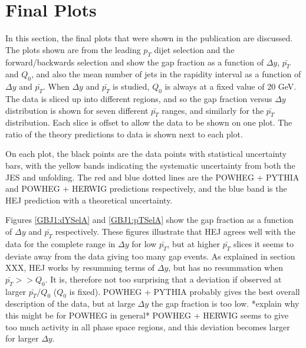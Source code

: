 \section{Final Plots}
\label{sec:GBJ1:FinalPlots}
In this section, the final plots that were shown in the publication are discussed. The plots shown are from  the leading $p_T$ dijet selection and the forward/backwards selection and show the gap fraction as a function of $\Delta y$, $\bar{p_T}$ and $Q_0$, and also the mean number of jets in the rapidity interval as a function of $\Delta y$ and $\bar{p_T}$. When $\Delta y$ and $\bar{p_T}$ is studied, $Q_0$ is always at a fixed value of 20 GeV. The data is sliced up into different regions, and so the gap fraction versus $\Delta y$ distribution is shown for seven different $\bar{p_T}$ ranges, and similarly for the $\bar{p_T}$ distribution. Each slice is offset to allow the data to be shown on one plot. The ratio of the theory predictions to data is shown next to each plot.

On each plot, the black points are the data points with statistical uncertainty bars, with the yellow bands indicating the systematic uncertainty from both the JES and unfolding. The red and blue dotted lines are the POWHEG + PYTHIA and POWHEG + HERWIG predictions respectively, and the blue band is the HEJ prediction with a theoretical uncertainty.

Figures \ref{GBJ1:dYSelA} and \ref{GBJ1:pTSelA} show the gap fraction as a function of $\Delta y$ and $\bar{p_T}$ respectively. These figures illustrate that HEJ  agrees well with the data for the complete range in $\Delta y$ for low $\bar{p_T}$, but at higher $\bar{p_T}$ slices it seems to deviate away from the data giving too many gap events. As explained in section XXX, HEJ works by resumming terms of $\Delta y$, but has no resummation when $\bar{p_T}>>Q_0$. It is, therefore not too surprising that a deviation if observed at larger $\bar{p_T}/Q_0$ ($Q_0$ is fixed). 
POWHEG + PYTHIA probably gives the best overall description of the data, but at large $\Delta y$ the gap fraction is too low. *explain why this might be for POWHEG in general*  POWHEG + HERWIG seems to give too much activity in all phase space regions, and this deviation becomes larger for larger $\Delta y$. 




